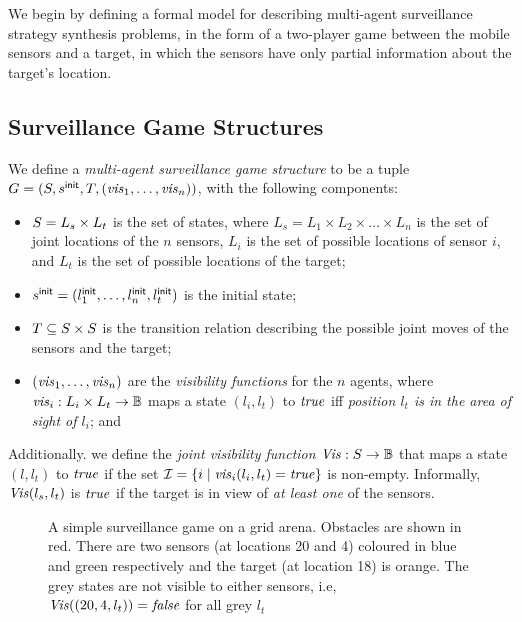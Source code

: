We begin by defining a formal model for describing multi-agent surveillance strategy synthesis problems, in the form of a two-player game between the mobile sensors and a target, in which the sensors have only partial information about the target's location. 

\subsection{Surveillance Game Structures}\label{sec:surveillance-games}
We define a \emph{multi-agent surveillance game structure} to be  a tuple $G  = (S,s^{\mathsf{init}},T,(\mathit{vis}_1,\dots,\mathit{vis}_n))$, with the following components:
\begin{itemize}
\item $S = L_s \times L_t$ is the set of states, where $L_{s} = L_1 \times L_2 \times\dots \times L_n$ is the set of joint locations of the $n$ sensors, $L_i$ is the set of possible locations of sensor $i$,  and $L_t$ is the set of possible locations of the target;
\item $s^{\mathsf{init}} = (l^{\mathsf{init}}_1,\ldots,l^{\mathsf{init}}_n,l_t^{\mathsf{init}})$ is the initial state;
\item $T \subseteq S \times S$ is the transition relation describing the possible joint moves of the sensors and the target;
\item  $(\mathit{vis}_1,\dots,\mathit{vis}_n)$ are the \textit{visibility functions} for the $n$ agents, where $\mathit{vis}_i: L_{i} \times L_t \to \mathbb{B}$ maps a state $(l_{i},l_t)$ to $\mathit{true}$ iff \emph{ position $l_t$ is in the area of sight of $l_i$}; and
\end{itemize}

Additionally. we define the \emph{joint visibility function} $\mathit{Vis} : S \to \mathbb{B}$ that maps a state $(l,l_t)$ to $\mathit{true}$ if the set $\mathcal{I} = \{i \mid \mathit{vis}_i(l_i,l_t) = \mathit{true}\}$ is non-empty. Informally, $\mathit{Vis}(l_s,l_t)$ is $\mathit{true}$ if the target is in view of \emph{at least one} of the sensors.

\begin{figure}
{}
\caption{A simple surveillance game on a grid arena. Obstacles are shown in red. There are two sensors (at locations 20 and 4) coloured in blue and green respectively and the target (at location 18) is orange. The grey states are not visible to either sensors, i.e, $\mathit{Vis}((20,4,l_t)) = \mathit{false}$ for all grey $l_t$  }
\label{fig:simple-surveillance-game}
\vspace{-.7cm}
\end{figure}


